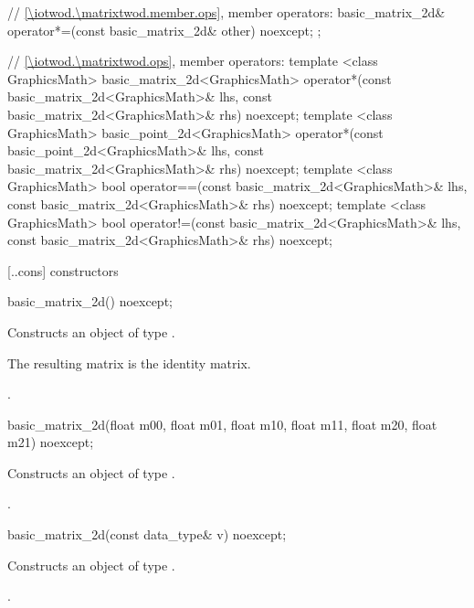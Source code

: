\begin{codeblock}
{{    // \ref{\iotwod.\matrixtwod.member.ops}, member operators:
    basic_matrix_2d& operator*=(const basic_matrix_2d& other) noexcept;
  };

  // \ref{\iotwod.\matrixtwod.ops}, member operators:
  template <class GraphicsMath>
  basic_matrix_2d<GraphicsMath> operator*(const basic_matrix_2d<GraphicsMath>& lhs,
    const basic_matrix_2d<GraphicsMath>& rhs) noexcept;
  template <class GraphicsMath>
  basic_point_2d<GraphicsMath> operator*(const basic_point_2d<GraphicsMath>& lhs,
    const basic_matrix_2d<GraphicsMath>& rhs) noexcept;
  template <class GraphicsMath>
  bool operator==(const basic_matrix_2d<GraphicsMath>& lhs,
    const basic_matrix_2d<GraphicsMath>& rhs) noexcept;
  template <class GraphicsMath>
  bool operator!=(const basic_matrix_2d<GraphicsMath>& lhs,
    const basic_matrix_2d<GraphicsMath>& rhs) noexcept;
}
\end{codeblock}

 [\iotwod.\matrixtwod.cons] { constructors}

%
\begin{itemdecl}
basic_matrix_2d() noexcept;
\end{itemdecl}
\begin{itemdescr}
\pnum
\effects
Constructs an object of type .

\pnum
\begin{note}
The resulting matrix is the identity matrix.
\end{note}

\pnum
\postconditions
{}.
\end{itemdescr}

%
\begin{itemdecl}
basic_matrix_2d(float m00, float m01, float m10, float m11,
  float m20, float m21) noexcept;
\end{itemdecl}
\begin{itemdescr}
\pnum
\effects
Constructs an object of type .

\pnum
\postconditions{} .
\end{itemdescr}

%
\begin{itemdecl}
basic_matrix_2d(const data_type& v) noexcept;
\end{itemdecl}
\begin{itemdescr}
\pnum
\effects
Constructs an object of type .
	
\pnum
\postconditions{} .
\end{itemdescr}

